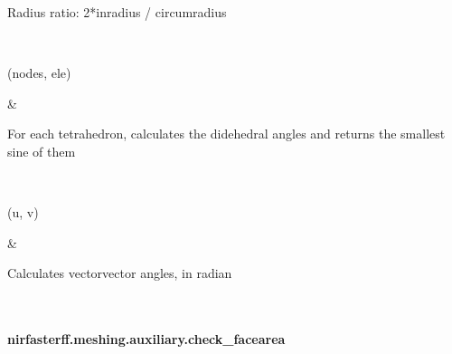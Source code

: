\documentclass[letterpaper,10pt,english]{sphinxmanual}
\begin{document}
\begin{savenotes}
\begin{longtable}{}
\begin{varwidth}[t]{}
\sphinxAtStartPar
Radius ratio: 2*inradius / circumradius
\sphinxbeforeendvarwidth
\end{varwidth}%
\\
\sphinxhline\begin{varwidth}[t]{}
\sphinxAtStartPar
{\hyperref[\detokenize{_autosummary/nirfasterff.meshing.auxiliary.simpqual:nirfasterff.meshing.auxiliary.simpqual}]{}}(nodes, ele)
\sphinxbeforeendvarwidth
\end{varwidth}%
&\begin{varwidth}[t]{}
\sphinxAtStartPar
For each tetrahedron, calculates the didehedral angles and returns the smallest sine of them
\sphinxbeforeendvarwidth
\end{varwidth}%
\\
\sphinxhline\begin{varwidth}[t]{}
\sphinxAtStartPar
{\hyperref[\detokenize{_autosummary/nirfasterff.meshing.auxiliary.vector_vector_angle:nirfasterff.meshing.auxiliary.vector_vector_angle}]{}}(u, v)
\sphinxbeforeendvarwidth
\end{varwidth}%
&\begin{varwidth}[t]{}
\sphinxAtStartPar
Calculates vector\sphinxhyphen{}vector angles, in radian
\sphinxbeforeendvarwidth
\end{varwidth}%
\\
\sphinxbottomrule
\end{longtable}
\sphinxtableafterendhook
\sphinxatlongtableend
\end{savenotes}

\sphinxstepscope


\paragraph{nirfasterff.meshing.auxiliary.check\_facearea}
\label{\detokenize{_autosummary/nirfasterff.meshing.auxiliary.check_facearea:nirfasterff-meshing-auxiliary-check-facearea}}\label{\detokenize{_autosummary/nirfasterff.meshing.auxiliary.check_facearea::doc}}
\end{document}
